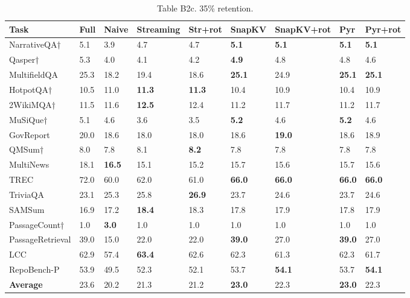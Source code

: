 \documentclass[10pt,letterpaper]{article}
\begin{document}
\begin{table}[H]
\centering
\small
\caption*{Table B2c. 35\% retention.}
\begin{tabular}{@{}lllllllll@{}}
\toprule
Task & Full & Naive & Streaming & Str+rot & SnapKV & SnapKV+rot & Pyr &
Pyr+rot\\
\midrule
    NarrativeQA† & 5.1 & 3.9 & 4.7 & 4.7 & \textbf{5.1} & \textbf{5.1} & \textbf{5.1} & \textbf{5.1}\\
    Qasper† & 5.3 & 4.0 & 4.1 & 4.2 & \textbf{4.9} & 4.8 & 4.8 & 4.6\\
    MultifieldQA & 25.3 & 18.2 & 19.4 & 18.6 & \textbf{25.1} & 24.9 & \textbf{25.1} & \textbf{25.1}\\
    HotpotQA† & 10.5 & 11.0 & \textbf{11.3} & \textbf{11.3} & 10.4 & 10.9 & 10.4 & 10.9\\
    2WikiMQA† & 11.5 & 11.6 & \textbf{12.5} & 12.4 & 11.2 & 11.7 & 11.2 & 11.7\\
    MuSiQue† & 5.1 & 4.6 & 3.6 & 3.5 & \textbf{5.2} & 4.6 & \textbf{5.2} & 4.6\\
    GovReport & 20.0 & 18.6 & 18.0 & 18.0 & 18.6 & \textbf{19.0} & 18.6 & 18.9\\
    QMSum† & 8.0 & 7.8 & 8.1 & \textbf{8.2} & 7.8 & 7.8 & 7.8 & 7.8\\
    MultiNews & 18.1 & \textbf{16.5} & 15.1 & 15.2 & 15.7 & 15.6 & 15.7 & 15.6\\
    TREC & 72.0 & 60.0 & 62.0 & 61.0 & \textbf{66.0} & \textbf{66.0} & \textbf{66.0} & \textbf{66.0}\\
    TriviaQA & 23.1 & 25.3 & 25.8 & \textbf{26.9} & 23.7 & 24.6 & 23.7 & 24.6\\
    SAMSum & 16.9 & 17.2 & \textbf{18.4} & 18.3 & 17.8 & 17.9 & 17.8 & 17.9\\
    PassageCount† & 1.0 & \textbf{3.0} & 1.0 & 1.0 & 1.0 & 1.0 & 1.0 & 1.0\\
    PassageRetrieval & 39.0 & 15.0 & 22.0 & 22.0 & \textbf{39.0} & 27.0 & \textbf{39.0} & 27.0\\
    LCC & 62.9 & 57.4 & \textbf{63.4} & 62.6 & 62.3 & 61.3 & 62.3 & 61.7\\
    RepoBench-P & 53.9 & 49.5 & 52.3 & 52.1 & 53.7 & \textbf{54.1} & 53.7 & \textbf{54.1}\\
    \textbf{Average} & 23.6 & 20.2 & 21.3 & 21.2 & \textbf{23.0} & 22.3 & \textbf{23.0} & 22.3\\
\bottomrule
\end{tabular}
\end{table}
\end{document}
